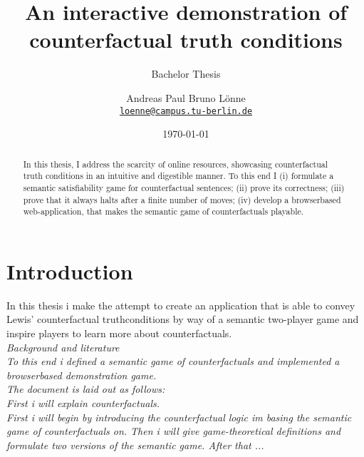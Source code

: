 \documentclass[a4paper,american]{paper}
\date{\today}
\providecommand*{\code}[1]{\texttt{#1}}
\theoremstyle{definition}\newtheorem{definition}{Definition}
\begin{document}
\title{An interactive demonstration of counterfactual truth conditions}

\subtitle{Bachelor Thesis}

\author{%
	Andreas Paul Bruno Lönne\\
	\code{\href{mailto:loenne@campus.tu-berlin.de}{loenne@campus.tu-berlin.de}}
}


\maketitle

\begin{abstract}
In this thesis, I address the scarcity of online resources, showcasing counterfactual truth conditions in an intuitive and digestible manner. To this end I (i) formulate a semantic satisfiability game for counterfactual sentences; (ii) prove its correctness; (iii) prove that it always halts after a finite number of moves; (iv) develop a browserbased web-application, that makes the semantic game of counterfactuals playable.
\end{abstract}
\section{Introduction}
In this thesis i make the attempt to create an application that is able to convey Lewis' counterfactual truthconditions by way of a semantic two-player game and inspire players to learn more about counterfactuals.\\
\textit{Background and literature\\
To this end i defined a semantic game of counterfactuals and implemented a browserbased demonstration game.\\
The document is laid out as follows:\\
First i will explain counterfactuals.\\
First i will begin by introducing the counterfactual logic im basing the semantic game of counterfactuals on. Then i will give game-theoretical definitions and formulate two versions of the semantic game. After that ...}
\end{document}
